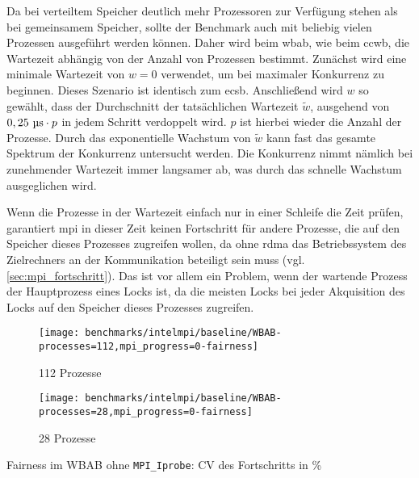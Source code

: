 Da bei verteiltem Speicher deutlich mehr Prozessoren zur Verfügung stehen
als bei gemeinsamem Speicher,
sollte der Benchmark auch mit beliebig vielen Prozessen ausgeführt werden können.
Daher wird beim \gls{wbab},
wie beim \gls{ccwb},
die Wartezeit abhängig von der Anzahl von Prozessen bestimmt.
Zunächst wird eine minimale Wartezeit von $w = 0$ verwendet,
um bei maximaler \gls{Konkurrenz} zu beginnen.
Dieses Szenario ist identisch zum \gls{ecsb}.
Anschließend wird $w$ so gewählt,
dass der Durchschnitt der tatsächlichen Wartezeit $\tilde{w}$,
ausgehend von $0,25~\text{\textmu{s}} \cdot p$ in jedem Schritt verdoppelt wird.
$p$ ist hierbei wieder die Anzahl der Prozesse.
Durch das exponentielle Wachstum von $\tilde{w}$ kann fast das gesamte Spektrum der \gls{Konkurrenz} untersucht werden.
Die \gls{Konkurrenz} nimmt nämlich bei zunehmender Wartezeit immer langsamer ab,
was durch das schnelle Wachstum ausgeglichen wird.

Wenn die Prozesse in der Wartezeit einfach nur in einer Schleife die Zeit prüfen,
garantiert \gls{mpi} in dieser Zeit keinen Fortschritt für andere Prozesse,
die auf den Speicher dieses Prozesses zugreifen wollen,
da ohne \gls{rdma} das Betriebssystem des Zielrechners an der Kommunikation beteiligt sein muss (vgl. \autoref{sec:mpi_fortschritt}).
Das ist vor allem ein Problem,
wenn der wartende Prozess der Hauptprozess eines Locks ist,
da die meisten Locks bei jeder Akquisition des Locks auf den Speicher dieses Prozesses zugreifen.

\begin{benchmark}[h]
    \begin{subfigure}{.5\textwidth}
        \texttt{[image: benchmarks/intelmpi/baseline/WBAB-processes=112,mpi\_progress=0-fairness]}
        \caption{112 Prozesse}
        \label{ben:baseline_wbab_112_no_progress_fairness}
    \end{subfigure}
    \begin{subfigure}{.5\textwidth}
        \texttt{[image: benchmarks/intelmpi/baseline/WBAB-processes=28,mpi\_progress=0-fairness]}
        \caption{28 Prozesse}
        \label{ben:baseline_wbab_28_no_progress_fairness}
    \end{subfigure}
    \caption{Fairness im WBAB ohne \texttt{MPI\_Iprobe}: CV des Fortschritts in \%}
    \label{ben:baseline_wbab_no_progress_fairness}
\end{benchmark}

